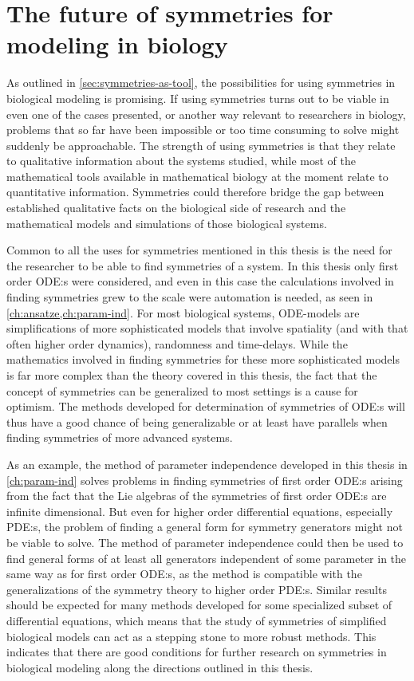 \section{The future of symmetries for modeling in biology} \label{sec:future}

As outlined in \cref{sec:symmetries-as-tool}, the possibilities for using symmetries in biological modeling is promising.
If using symmetries turns out to be viable in even one of the cases presented, or another way relevant to researchers in biology, problems that so far have been impossible or too time consuming to solve might suddenly be approachable.
The strength of using symmetries is that they relate to qualitative information about the systems studied, while most of the mathematical tools available in mathematical biology at the moment relate to quantitative information.
Symmetries could therefore bridge the gap between established qualitative facts on the biological side of research and the mathematical models and simulations of those biological systems.

Common to all the uses for symmetries mentioned in this thesis is the need for the researcher to be able to find symmetries of a system.
In this thesis only first order ODE:s were considered, and even in this case the calculations involved in finding symmetries grew to the scale were automation is needed, as seen in \cref{ch:ansatze,ch:param-ind}.
For most biological systems, ODE-models are simplifications of more sophisticated models that involve spatiality (and with that often higher order dynamics), randomness and time-delays.
While the mathematics involved in finding symmetries for these more sophisticated models is far more complex than the theory covered in this thesis, the fact that the concept of symmetries can be generalized to most settings is a cause for optimism.
The methods developed for determination of symmetries of ODE:s will thus have a good chance of being generalizable or at least have parallels when finding symmetries of more advanced systems.

As an example, the method of parameter independence developed in this thesis in \cref{ch:param-ind} solves problems in finding symmetries of first order ODE:s arising from the fact that the Lie algebras of the symmetries of first order ODE:s are infinite dimensional.
But even for higher order differential equations, especially PDE:s, the problem of finding a general form for symmetry generators might not be viable to solve.
The method of parameter independence could then be used to find general forms of at least all generators independent of some parameter in the same way as for first order ODE:s, as the method is compatible with the generalizations of the symmetry theory to higher order PDE:s.
Similar results should be expected for many methods developed for some specialized subset of differential equations, which means that the study of symmetries of simplified biological models can act as a stepping stone to more robust methods.
This indicates that there are good conditions for further research on symmetries in biological modeling along the directions outlined in this thesis.
